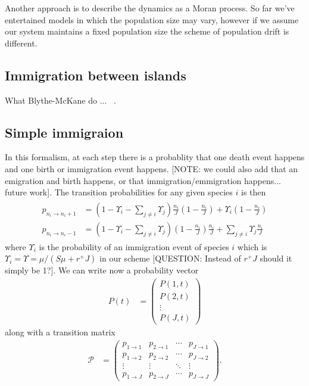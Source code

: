 \documentclass[11pt,a4paper,final]{iopart}
\begin{document}
Another approach is to describe the dynamics as a Moran process.
So far we've entertained models in which the population size may vary, however if we assume our system maintains a fixed population size the scheme of population drift is different.

\subsection{Immigration between islands}

What Blythe-McKane do ... ~\cite{ref4}.

\subsection{Simple immigraion}
In this formalism, at each step there is a probablity that one death event happens and one birth or immigration event happens.
[NOTE: we could also add that an emigration and birth happens, or that immigration/emmigration happens... future work].
The transition probabilities for any given species $i$ is then
\begin{align}\label{morantransition}
\begin{split}
p_{n_i \rightarrow n_i+1} &= (1-\Upsilon_i-\sum_{j\neq i} \Upsilon_j) \frac{n_i}{J} (1 - \frac{n_i}{J}) + \Upsilon_i (1-\frac{n_i}{J}) \\
p_{n_i \rightarrow n_i-1} &= (1-\Upsilon_i-\sum_{j\neq i} \Upsilon_j) (1 - \frac{n_i}{J}) \frac{n_i}{J} + \sum_{j\neq i} \Upsilon_j \frac{n_i}{J}
\end{split}
\end{align}
where $\Upsilon_i$ is the probability of an immigration event of species $i$ which is $\Upsilon_i = \Upsilon = \mu / (S\mu + r^+J)$ in our scheme [QUESTION: Instead of $r^+J$ should it simply be 1?].
We can write now a probability vector
\begin{align*}
P(t) &= 
\begin{pmatrix}
P(1,t) \\
P(2,t) \\
\vdots \\
P(J,t)
\end{pmatrix}
\end{align*}
along with a transition matrix
\begin{align*}
\mathcal{P} &=
\begin{pmatrix}
p_{1 \rightarrow 1} & p_{2 \rightarrow 1} & \cdots & p_{J \rightarrow 1} \\
p_{1 \rightarrow 2} & p_{2 \rightarrow 2} & \cdots & p_{J \rightarrow 2} \\
\vdots & \vdots & \ddots & \vdots \\
p_{1 \rightarrow J} & p_{2 \rightarrow J} & \cdots & p_{J \rightarrow J}
\end{pmatrix}.
\end{align*}
\end{document}
